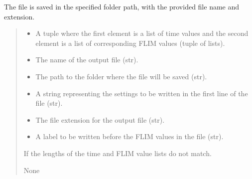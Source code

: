 \documentclass[letterpaper,10pt,english]{sphinxmanual}
\begin{document}
\begin{fulllineitems}
\begin{fulllineitems}
\sphinxAtStartPar
The file is saved in the specified folder path, with the provided file name and extension.
\begin{quote}\begin{description}
\begin{itemize}
\item {} 
\sphinxAtStartPar
{} \textendash{} A tuple where the first element is a list of time values and the second 
element is a list of corresponding FLIM values (tuple of lists).

\item {} 
\sphinxAtStartPar
{} \textendash{} The name of the output file (str).

\item {} 
\sphinxAtStartPar
{} \textendash{} The path to the folder where the file will be saved (str).

\item {} 
\sphinxAtStartPar
{} \textendash{} A string representing the settings to be written in the first line of the file (str).

\item {} 
\sphinxAtStartPar
{} \textendash{} The file extension for the output file (str).

\item {} 
\sphinxAtStartPar
{} \textendash{} A label to be written before the FLIM values in the file (str).

\end{itemize}

\sphinxAtStartPar
{} \textendash{} If the lengths of the time and FLIM value lists do not match.

\sphinxAtStartPar
None

\end{description}\end{quote}

\end{fulllineitems}



\end{fulllineitems}
\end{document}

